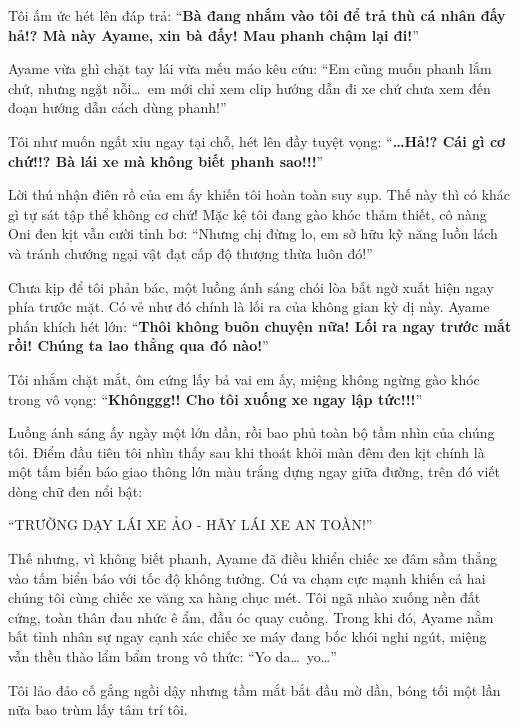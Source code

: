 \documentclass[../main.tex]{subfiles}
\begin{document}
Tôi ấm ức hét lên đáp trả:
``\textbf{Bà đang nhắm vào tôi để trả thù cá nhân đấy hả!? Mà này Ayame, xin bà đấy! Mau phanh chậm lại đi!}''

Ayame vừa ghì chặt tay lái vừa mếu máo kêu cứu:
``Em cũng muốn phanh lắm chứ, nhưng ngặt nỗi\dots\ em mới chỉ xem clip hướng dẫn đi xe chứ chưa xem đến đoạn hướng dẫn cách dùng phanh!''

Tôi như muốn ngất xỉu ngay tại chỗ, hét lên đầy tuyệt vọng:
``\textbf{\dots Hả!? Cái gì cơ chứ!!? Bà lái xe mà không biết phanh sao!!!}''

Lời thú nhận điên rồ của em ấy khiến tôi hoàn toàn suy sụp. Thế này thì có khác gì tự sát tập thể không cơ chứ! Mặc kệ tôi đang gào khóc thảm thiết, cô nàng Oni đen kịt vẫn cười tỉnh bơ:
``Nhưng chị đừng lo, em sở hữu kỹ năng luồn lách và tránh chướng ngại vật đạt cấp độ thượng thừa luôn đó!''


Chưa kịp để tôi phản bác, một luồng ánh sáng chói lòa bất ngờ xuất hiện ngay phía trước mặt. Có vẻ như đó chính là lối ra của không gian kỳ dị này. Ayame phấn khích hét lớn:
``\textbf{Thôi không buôn chuyện nữa! Lối ra ngay trước mắt rồi! Chúng ta lao thẳng qua đó nào!}''

Tôi nhắm chặt mắt, ôm cứng lấy bả vai em ấy, miệng không ngừng gào khóc trong vô vọng:
``\textbf{Khônggg!! Cho tôi xuống xe ngay lập tức!!!}''

Luồng ánh sáng ấy ngày một lớn dần, rồi bao phủ toàn bộ tầm nhìn của chúng tôi. Điểm đầu tiên tôi nhìn thấy sau khi thoát khỏi màn đêm đen kịt chính là một tấm biển báo giao thông lớn màu trắng dựng ngay giữa đường, trên đó viết dòng chữ đen nổi bật:

\begin{center}
  ``TRƯỜNG DẠY LÁI XE ẢO - HÃY LÁI XE AN TOÀN!''
\end{center}


Thế nhưng, vì không biết phanh, Ayame đã điều khiển chiếc xe đâm sầm thẳng vào tấm biển báo với tốc độ không tưởng. Cú va chạm cực mạnh khiến cả hai chúng tôi cùng chiếc xe văng xa hàng chục mét. Tôi ngã nhào xuống nền đất cứng, toàn thân đau nhức ê ẩm, đầu óc quay cuồng. Trong khi đó, Ayame nằm bất tỉnh nhân sự ngay cạnh xác chiếc xe máy đang bốc khói nghi ngút, miệng vẫn thều thào lẩm bẩm trong vô thức:
``Yo da\dots\ yo\dots''

Tôi lảo đảo cố gắng ngồi dậy nhưng tầm mắt bắt đầu mờ dần, bóng tối một lần nữa bao trùm lấy tâm trí tôi.
\end{document}
